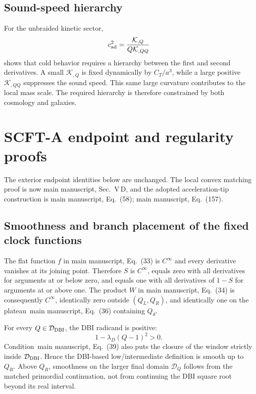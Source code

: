 \documentclass[aps,prd,reprint,onecolumn,notitlepage,nofootinbib,longbibliography,floatfix]{revtex4-2}
\theoremstyle{scstyle}
\theoremstyle{definition}
\theoremstyle{remark}
\newcommand{\cK}{\mathcal K}
\begin{document}
\subsection{Sound-speed hierarchy}

For the unbraided kinetic sector,
\begin{equation}
c_{\rm ad}^2
=\frac{\cK_{,Q}}{Q\cK_{,QQ}}
\label{eq:cadagain}
\end{equation}
shows that cold behavior requires a hierarchy between the first and second derivatives. A small $\cK_{,Q}$ is fixed dynamically by $C_T/a^3$, while a large positive $\cK_{,QQ}$ suppresses the sound speed. This same large curvature contributes to the local mass scale. The required hierarchy is therefore constrained by both cosmology and galaxies.

\section{SCFT-A endpoint and regularity proofs}
\label{app:benchmarkproofs}

The exterior endpoint identities below are unchanged. The local convex matching proof is now main manuscript, Sec.~V\,D, and the adopted acceleration-tip construction is main manuscript, Eq.~(58); main manuscript, Eq.~(157).

\subsection{Smoothness and branch placement of the fixed clock functions}

The flat function $f$ in main manuscript, Eq.~(33) is $C^\infty$ and every derivative vanishes at its joining point. Therefore $S$ is $C^\infty$, equals zero with all derivatives for arguments at or below zero, and equals one with all derivatives of $1-S$ for arguments at or above one. The product $W$ in main manuscript, Eq.~(34) is consequently $C^\infty$, identically zero outside $(Q_L,Q_R)$, and identically one on the plateau~main manuscript, Eq.~(36) containing $Q_d$.

For every $Q\in\mathcal D_{\rm DBI}$, the DBI radicand is positive:
\begin{equation}
1-\lambda_D(Q-1)^2>0.
\label{eq:benchmarkDBIreal}
\end{equation}
Condition~main manuscript, Eq.~(39) also puts the closure of the window strictly inside $\mathcal D_{\rm DBI}$. Hence the DBI-based low/intermediate definition is smooth up to $Q_R$. Above $Q_R$, smoothness on the larger final domain $\mathcal D_Q$ follows from the matched primordial continuation, not from continuing the DBI square root beyond its real interval.
\end{document}
